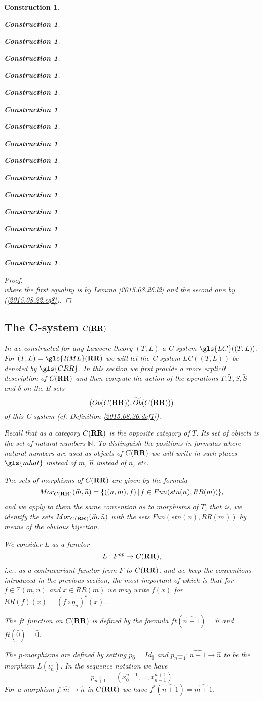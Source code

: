 \documentclass[onecolumn,12pt]{amsart}
\numberwithin{proposition}{subsection}
\newtheorem{construction}[proposition]{Construction}
\newcommand{\sr}{\rightarrow}
\newcommand{\nn}{{\mathbb N}}
\newcommand{\nat}{\nn}
\newcommand{\wt}{\widetilde}
\newcommand{\wh}{\widehat}
\newcommand{\mbind}[1]{{#1^*}}
\newcommand{\RR}{{\bf RR}}
\newcommand{\FF}{{\mathbb F}}
\begin{document}
\begin{construction}
\begin{construction}
\begin{construction}
\begin{construction}
\begin{construction}
\begin{construction}
\begin{construction}
\begin{construction}
\begin{construction}
\begin{construction}
\begin{construction}
\begin{construction}
\begin{construction}
\begin{construction}
\begin{construction}
\begin{construction}
\begin{proof}
\begin{equation*}
\end{equation*}
where the first equality is by Lemma \ref{2015.08.26.l2} and the second one by
(\ref{2015.08.22.eq8}).
\end{proof}
%

\subsection{The C-system $C(\RR)$}
%
\label{CRR}

In \cite{LandC} we constructed for any Lawvere theory $(T,L)$ a C-system
$\gls{LC}((T,L))$. For $(T,L)=\gls{RML}(\RR)$ we will let the C-system $LC((T,L))$ be denoted by
$\gls{CRR}$. In this section we first provide a more explicit description of
$C(\RR)$ and then compute the action of the operations $T,\wt{T},S,\wt{S}$ and
$\delta$ on the B-sets $$(Ob(C(\RR)),\wt{Ob}(C(\RR)))$$ of this C-system
(cf.{} Definition \ref{2015.08.26.def1}).

Recall that as a category $C(\RR)$ is the opposite category of $T$.  Its set of
objects is the set of natural numbers $\nat$. To distinguish the positions in
formulas where natural numbers are used as objects of $C(\RR)$ we will write in
such places $\gls{mhat}$ instead of $m$, $\wh{n}$ instead of $n$, etc.

The sets of morphisms of $C(\RR)$ are given by the formula 
%
$$Mor_{C(\RR)}(\wh{m},\wh{n})=\{((n,m),f)\,|\,f\in Fun(stn(n),RR(m))\},$$
%
and we apply to them the same convention as to morphisms of $T$, that is, we
identify the sets $Mor_{C(\RR)}(\wh{m},\wh{n})$ with the sets
$Fun(stn(n),RR(m))$ by means of the obvious bijection.

We consider $L$ as a functor
%
$${L}:F^{op}\sr C(\RR),$$
%
i.e., as a contravariant functor from $F$ to $C(\RR)$, and we keep the conventions
introduced in the previous section, the most important of which is that for
$f\in \FF(m,n)$ and $x\in RR(m)$ we may write $f(x)$ for 
$RR(f)(x)=\mbind{(f\circ \eta_{n})}(x)$.

The $ft$ function on $C(\RR)$ is defined by the formula $ft(\wh{n+1})=\wh{n}$
and $ft(\wh{0})=\wh{0}$.

The $p$-morphisms are defined by setting $p_{\wh{0}}=Id_{\wh{0}}$ and
$p_{\wh{n+1}}:\wh{n+1}\sr \wh{n}$ to be the morphism $L(\iota_n^1)$. In the
sequence notation we have
%
\begin{equation}\label{2015.08.24.eq6}
p_{\wh{n+1}}=(x_0^{n+1},\dots,x_{n-1}^{n+1})
\end{equation}%
%
For a morphism $f:\wh{m}\sr \wh{n}$ in $C(\RR)$ we have $f^*(\wh{n+1})=\wh{m+1}$. 


\end{construction}
\end{construction}
\end{construction}
\end{construction}
\end{construction}
\end{construction}
\end{construction}
\end{construction}
\end{construction}
\end{construction}
\end{construction}
\end{construction}
\end{construction}
\end{construction}
\end{construction}
\end{construction}
\end{document}
